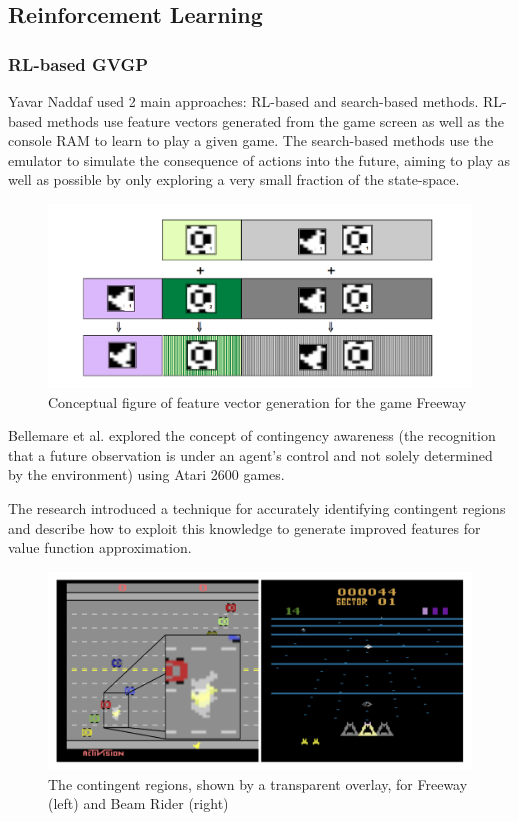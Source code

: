 \documentclass{beamer}
\begin{document}
\subsection{Reinforcement Learning}
\begin{frame}[allowframebreaks]
\frametitle{RL-based GVGP}
Yavar Naddaf \cite{6} used 2 main approaches: RL-based and search-based methods. RL-based methods use feature vectors generated from the game screen as well as the console RAM to learn to play a given game. The search-based methods use the emulator to simulate the consequence of actions into the future, aiming to play as well as possible by only exploring a very small fraction of the state-space.

\begin{figure}
  \includegraphics[width=0.6\linewidth]{figures/featurevector}
  \caption{ Conceptual figure of feature vector generation for the game Freeway}
\end{figure}

Bellemare et al. \cite{7} explored the concept of contingency awareness (the recognition that a future observation is under an agent's control and not solely determined by the environment) using Atari 2600 games.

The research introduced a technique for accurately identifying contingent regions and describe how to exploit this knowledge to generate improved features for value function approximation.
\begin{figure}
  \includegraphics[width=0.5\linewidth]{figures/contingentregions}
  \caption{ The contingent regions, shown by a transparent overlay, for Freeway (left) and Beam Rider (right)}
\end{figure}
\end{frame}
\end{document}
